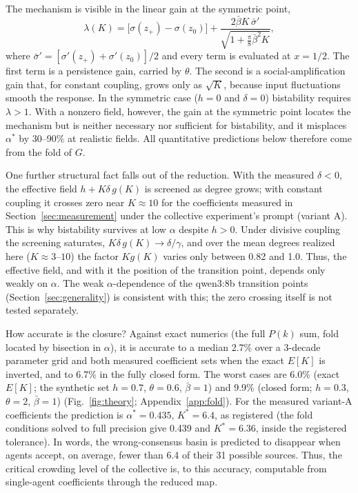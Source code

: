 \documentclass{ieeeaccess}
\newcommand{\astar}{\alpha^{*}}
\begin{document}
The mechanism is visible in the linear gain at the symmetric point,
\begin{equation}
\lambda(K) = \bigl[\sigma(z_+) - \sigma(z_0)\bigr]
+ \frac{2\bar\beta K\,\bar\sigma'}{\sqrt{1 + \tfrac{\pi}{8}\bar\beta^2 K}},
\end{equation}
where $\bar\sigma' = [\sigma'(z_+) + \sigma'(z_0)]/2$ and every term is
evaluated at $x = 1/2$. The first term is a persistence gain, carried by
$\theta$. The second is a social-amplification gain that, for constant
coupling, grows only as $\sqrt{K}$, because input fluctuations smooth the
response. In the symmetric case ($h = 0$ and $\delta = 0$) bistability
requires $\lambda > 1$. With a nonzero field, however, the gain at the
symmetric point locates the mechanism but is neither necessary nor
sufficient for bistability, and it misplaces $\astar$ by 30--90\% at
realistic fields. All quantitative predictions below therefore come from
the fold of $G$.

One further structural fact falls out of the reduction. With the measured
$\delta < 0$, the effective field $h + K\delta\,g(K)$ is screened as degree
grows; with constant coupling it crosses zero near $K \approx 10$ for the
coefficients measured in Section~\ref{sec:measurement} under the
collective experiment's prompt (variant A). This is why bistability
survives at low $\alpha$ despite $h > 0$. Under divisive coupling the
screening saturates, $K\delta\,g(K) \to \delta/\gamma$, and over the mean
degrees realized here ($K \approx 3$--$10$) the factor $K g(K)$ varies only
between 0.82 and 1.0. Thus, the effective field, and with it the position
of the transition point, depends only weakly on $\alpha$. The weak
$\alpha$-dependence of the qwen3:8b transition points
(Section~\ref{sec:generality}) is consistent with this; the zero crossing
itself is not tested separately.

How accurate is the closure? Against exact numerics (the full $P(k)$ sum,
fold located by bisection in $\alpha$), it is accurate to a median 2.7\%
over a 3-decade parameter grid and both measured coefficient sets when the
exact $E[K]$ is inverted, and to 6.7\% in the fully closed form. The worst
cases are 6.0\% (exact $E[K]$; the synthetic set $h = 0.7$, $\theta = 0.6$,
$\bar\beta = 1$) and 9.9\% (closed form; $h = 0.3$, $\theta = 2$,
$\bar\beta = 1$) (Fig.~\ref{fig:theory}; Appendix~\ref{app:fold}). For the measured variant-A
coefficients the prediction is $\astar = 0.435$, $K^* = 6.4$, as registered
(the fold conditions solved to full precision give 0.439 and $K^* = 6.36$,
inside the registered tolerance). In words, the wrong-consensus basin is
predicted to disappear when agents accept, on average, fewer than 6.4 of
their 31 possible sources. Thus, the critical crowding level of the
collective is, to this accuracy, computable from single-agent coefficients
through the reduced map.
\end{document}
